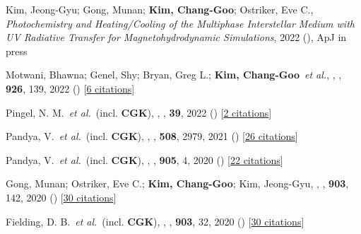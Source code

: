 \item[{32.}]Kim, Jeong-Gyu; Gong, Munan; \textbf{Kim, Chang-Goo}; Ostriker, Eve C., \textit{Photochemistry and Heating/Cooling of the Multiphase Interstellar Medium with UV Radiative Transfer for Magnetohydrodynamic Simulations}, 2022 (), ApJ in press

\item[{33.}]Motwani, Bhawna; Genel, Shy; Bryan, Greg L.; \textbf{Kim, Chang-Goo}~\textit{et al.}, , \apj, \textbf{926}, 139, 2022 () [\href{http://adsabs.harvard.edu/abs/2022ApJ...926..139M}{6 citations}]

\item[{34.}]Pingel, N. M.~\textit{et al.}~(incl. \textbf{CGK}), , \pasa, \textbf{39}, 2022 () [\href{http://adsabs.harvard.edu/abs/2022PASA...39....5P}{2 citations}]

\item[{35.}]Pandya, V.~\textit{et al.}~(incl. \textbf{CGK}), , \mnras, \textbf{508}, 2979, 2021 () [\href{http://adsabs.harvard.edu/abs/2021MNRAS.508.2979P}{26 citations}]

\item[{36.}]Pandya, V.~\textit{et al.}~(incl. \textbf{CGK}), , \apj, \textbf{905}, 4, 2020 () [\href{http://adsabs.harvard.edu/abs/2020ApJ...905....4P}{22 citations}]

\item[{37.}]Gong, Munan; Ostriker, Eve C.; \textbf{Kim, Chang-Goo}; Kim, Jeong-Gyu, , \apj, \textbf{903}, 142, 2020 () [\href{http://adsabs.harvard.edu/abs/2020ApJ...903..142G}{30 citations}]

\item[{38.}]Fielding, D. B.~\textit{et al.}~(incl. \textbf{CGK}), , \apj, \textbf{903}, 32, 2020 () [\href{http://adsabs.harvard.edu/abs/2020ApJ...903...32F}{30 citations}]

